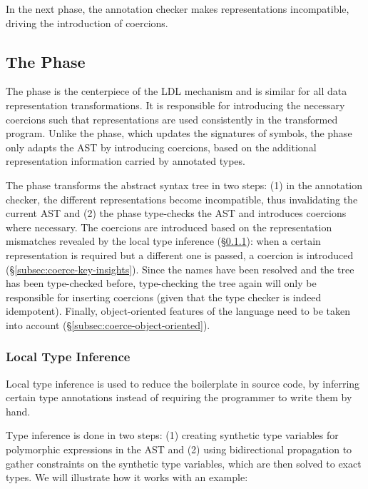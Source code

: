 In the next phase, the annotation checker makes representations incompatible, driving the introduction of coercions.

\subsection{The \Coerce{} Phase}
\label{sec:transform:coerce}

The \coerce{} phase is the centerpiece of the LDL mechanism and is similar for all data representation transformations. It is responsible for introducing the necessary coercions such that representations are used consistently in the transformed program. Unlike the \inject{} phase, which updates the signatures of symbols, the \coerce{} phase only adapts the AST by introducing coercions, based on the additional representation information carried by annotated types.

The \coerce{} phase transforms the abstract syntax tree in two steps: (1) in the annotation checker, the different representations become incompatible, thus invalidating the current AST and (2) the \coerce{} phase type-checks the AST and introduces coercions where necessary. The coercions are introduced based on the representation mismatches revealed by the local type inference (\S\ref{subsec:coerce-local-type-inference}): when a certain representation is required but a different one is passed, a coercion is introduced (\S\ref{subsec:coerce-key-insights}). Since the names have been resolved and the tree has been type-checked before, type-checking the tree again will only be responsible for inserting coercions (given that the type checker is indeed idempotent). Finally, object-oriented features of the language need to be taken into account (\S\ref{subsec:coerce-object-oriented}).

\subsubsection{Local Type Inference}
\label{subsec:coerce-local-type-inference}

Local type inference \cite{odersky-colored-local-type-inf, pierce-local-type-inference} is used to reduce the boilerplate in source code, by inferring certain type annotations instead of requiring the programmer to write them by hand.

Type inference is done in two steps: (1) creating synthetic type variables for polymorphic expressions in the AST and (2) using bidirectional propagation to gather constraints on the synthetic type variables, which are then solved to exact types. We will illustrate how it works with an example:

